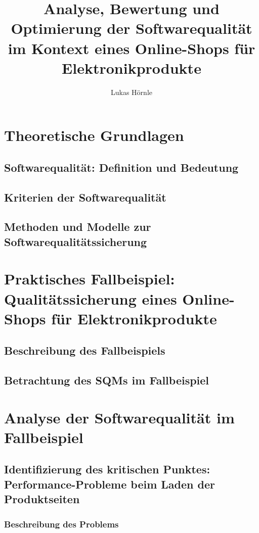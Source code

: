 \documentclass{article}
\begin{document}
\title{Analyse, Bewertung und Optimierung der Softwarequalität im Kontext eines Online-Shops für Elektronikprodukte}
\author{Lukas Hörnle}
\maketitle

\tableofcontents
\newpage


\section{Theoretische Grundlagen}
\subsection{Softwarequalität: Definition und Bedeutung}
\subsection{Kriterien der Softwarequalität}
\subsection{Methoden und Modelle zur Softwarequalitätssicherung}

\section{Praktisches Fallbeispiel: Qualitätssicherung eines Online-Shops für Elektronikprodukte}
\subsection{Beschreibung des Fallbeispiels}
\subsection{Betrachtung des SQMs im Fallbeispiel}

\section{Analyse der Softwarequalität im Fallbeispiel}
\subsection{Identifizierung des kritischen Punktes: Performance-Probleme beim Laden der Produktseiten}
\subsubsection{Beschreibung des Problems}
\end{document}

